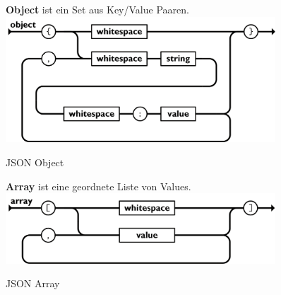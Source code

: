 \begin{figure}[H]
    \begin{minipage}[t]{0.45\textwidth}
        \flushleft\textbf{Object} ist ein Set aus Key/Value Paaren.
        \includegraphics[width=0.9\textwidth]{images/json_object}
        \caption{JSON Object}
        \label{fig:json_object}
    \end{minipage}\hfill
    \begin{minipage}[t]{0.45\textwidth}
        \flushleft\textbf{Array} ist eine geordnete Liste von Values.
        \includegraphics[width=0.9\textwidth]{images/json_array}
        \caption{JSON Array}
        \label{fig:json_array}
    \end{minipage}\hfill
\end{figure}
